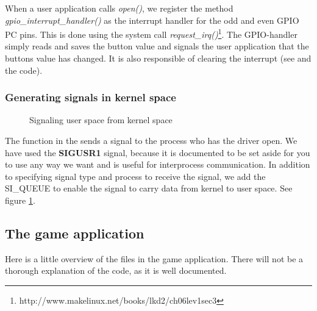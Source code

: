 When a user application calls \emph{open()}, we register the method \emph{gpio\_interrupt\_handler()} as the interrupt handler for the odd and even GPIO PC pins. This is done using the system call \emph{request\_irq()}\footnote{http://www.makelinux.net/books/lkd2/ch06lev1sec3}. The GPIO-handler simply reads and saves the button value and signals the user application that the buttons value has changed. It is also responsible of clearing the interrupt (see \cite[section 3]{compendium} and the code).   

\subsubsection{Generating signals in kernel space}
\begin{figure}[h]
	\centering
	
	\caption{Signaling user space from kernel space}
	\label{fig:signal-user-application}
\end{figure}
The  function in the  sends a signal to the process who has the driver open. We have used the \textbf{SIGUSR1} signal, because it is documented to be set aside for you to use any way we want and is useful for interprocess communication. In addition to specifying signal type and process to receive the signal, we add the SI\_QUEUE to enable the signal to carry data from kernel to user space. See figure \ref{fig:signal-user-application}.

\subsection{The game application}
Here is a little overview of the files in the game application. There will not be a thorough explanation of the code, as it is well documented.

